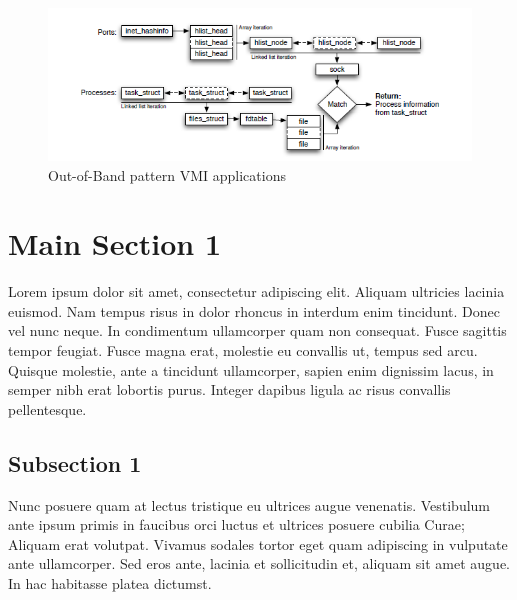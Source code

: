 \begin{figure}[htbp]
	\centering
		\includegraphics[scale = 0.8 ]{Figures/Figure4.png}
	\caption[Out-of-Band pattern VMI applications]{Out-of-Band pattern VMI applications}
	\label{fig:Guest Linux kernel data structures traversed by the VMWall user agent during correlation of the
process and TCP packet information}
\end{figure}


\section{Main Section 1}

Lorem ipsum dolor sit amet, consectetur adipiscing elit. Aliquam ultricies lacinia euismod. Nam tempus risus in dolor rhoncus in interdum enim tincidunt. Donec vel nunc neque. In condimentum ullamcorper quam non consequat. Fusce sagittis tempor feugiat. Fusce magna erat, molestie eu convallis ut, tempus sed arcu. Quisque molestie, ante a tincidunt ullamcorper, sapien enim dignissim lacus, in semper nibh erat lobortis purus. Integer dapibus ligula ac risus convallis pellentesque.

\subsection{Subsection 1}

Nunc posuere quam at lectus tristique eu ultrices augue venenatis. Vestibulum ante ipsum primis in faucibus orci luctus et ultrices posuere cubilia Curae; Aliquam erat volutpat. Vivamus sodales tortor eget quam adipiscing in vulputate ante ullamcorper. Sed eros ante, lacinia et sollicitudin et, aliquam sit amet augue. In hac habitasse platea dictumst.

